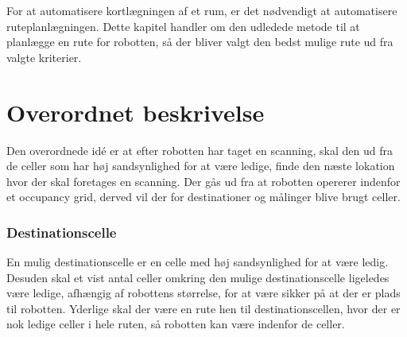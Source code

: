 
\newcommand{\unkcell}[3][]{\node (robot) [draw,fill=yellow, text centered, rectangle,
minimum height=\cellsize cm,minimum width=\cellsize cm, align=right] at ($(#2*\cellsize,#3*\cellsize) + (\cellsize/2,\cellsize/2)$) {$\scriptstyle #1$};}

\newcommand{\emptycell}[3][]{\node (robot) [draw,fill=green, text centered, rectangle,
minimum height=\cellsize cm,minimum width=\cellsize cm, align=right] at ($(#2*\cellsize,#3*\cellsize) + (\cellsize/2,\cellsize/2)$) {$\scriptstyle #1$};}

\newcommand{\occcell}[3][]{\node (robot) [draw,fill=red, text centered, rectangle,
minimum height=\cellsize cm,minimum width=\cellsize cm, align=right] at ($(#2*\cellsize,#3*\cellsize) + (\cellsize/2,\cellsize/2)$) {$\scriptstyle #1$};}

\newcommand{\scancell}[3][]{\node (robot) [draw,fill=orange, text centered, rectangle,
minimum height=\cellsize cm,minimum width=\cellsize cm, align=right] at ($(#2*\cellsize,#3*\cellsize) + (\cellsize/2,\cellsize/2)$) {$\scriptstyle #1$};}

\newcommand{\destcell}[3][]{\node (robot) [draw,fill=blue, text centered, rectangle,
minimum height=\cellsize cm,minimum width=\cellsize cm, align=right] at ($(#2*\cellsize,#3*\cellsize) + (\cellsize/2,\cellsize/2)$) {$\scriptstyle #1$};}

For at automatisere kortlægningen af et rum, er det nødvendigt at automatisere ruteplanlægningen.
Dette kapitel handler om den udledede metode til at planlægge en rute for robotten, så der bliver valgt den bedst mulige rute ud fra valgte kriterier.

\section{Overordnet beskrivelse}
Den overordnede idé er at efter robotten har taget en scanning, skal den ud fra de celler som har høj sandsynlighed for at være ledige, finde den næste lokation hvor der skal foretages en scanning.
Der gås ud fra at robotten opererer indenfor et occupancy grid, derved vil der for destinationer og målinger blive brugt celler.

\subsubsection{Destinationscelle}\label{rute:destinationscelle}
En mulig destinationscelle er en celle med høj sandsynlighed for at være ledig.
Desuden skal et vist antal celler omkring den mulige destinationscelle ligeledes være ledige, afhængig af robottens størrelse, for at være sikker på at der er plads til robotten.
Yderlige skal der være en rute hen til destinationscellen, hvor der er nok ledige celler i hele ruten, så robotten kan være indenfor de celler.

